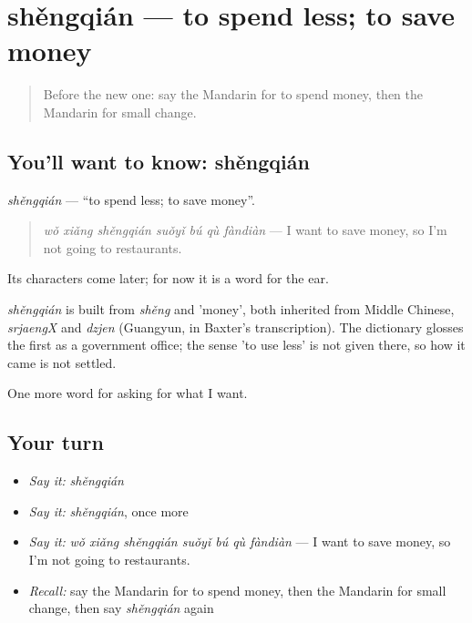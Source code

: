 \section[shěngqián]{shěngqián — to spend less; to save money}

\label{lesson:ZH-C188-shengqian}



\begin{quote}
Before the new one: say the Mandarin for to spend money, then the Mandarin for small change.
\end{quote}

\subsection*{You'll want to know: shěngqián}
\emph{shěngqián} — \textquotedblleft{}to spend less; to save money\textquotedblright{}.

\begin{quote}
\emph{wǒ xiǎng shěngqián suǒyǐ bú qù fàndiàn} — I want to save money, so I'm not going to restaurants.
\end{quote}

Its characters come later; for now it is a word for the ear.

\begin{cousinweb}
\emph{shěngqián} is built from \emph{shěng} and  'money', both inherited from Middle Chinese, \emph{srjaengX} and \emph{dzjen} (Guangyun, in Baxter's transcription). The dictionary glosses the first as a government office; the sense 'to use less' is not given there, so how it came is not settled.
\end{cousinweb}

\begin{grammarlens}[title={What you've built}]
One more word for asking for what I want.
\end{grammarlens}

\subsection*{Your turn}
\begin{itemize}
\raggedright
  \item \emph{Say it:} \emph{shěngqián}
  \item \emph{Say it:} \emph{shěngqián}, once more
  \item \emph{Say it:} \emph{wǒ xiǎng shěngqián suǒyǐ bú qù fàndiàn} — I want to save money, so I'm not going to restaurants.
  \item \emph{Recall:} say the Mandarin for to spend money, then the Mandarin for small change, then say \emph{shěngqián} again
\end{itemize}

